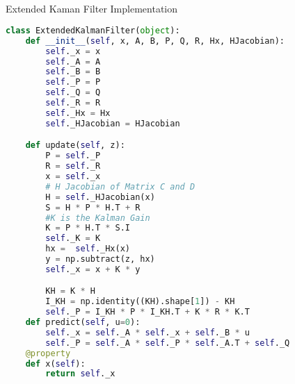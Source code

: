 \subsection{}{Extended Kaman Filter Implementation}

\begin{lstlisting}[language=Python, caption=Extended Kalaman Filter Script]  
class ExtendedKalmanFilter(object):
    def __init__(self, x, A, B, P, Q, R, Hx, HJacobian):
        self._x = x
        self._A = A
        self._B = B
        self._P = P
        self._Q = Q
        self._R = R
        self._Hx = Hx
        self._HJacobian = HJacobian

    def update(self, z):
        P = self._P
        R = self._R
        x = self._x
        # H Jacobian of Matrix C and D
        H = self._HJacobian(x)
        S = H * P * H.T + R
        #K is the Kalman Gain 
        K = P * H.T * S.I
        self._K = K
        hx =  self._Hx(x)
        y = np.subtract(z, hx)
        self._x = x + K * y

        KH = K * H
        I_KH = np.identity((KH).shape[1]) - KH
        self._P = I_KH * P * I_KH.T + K * R * K.T
    def predict(self, u=0):
        self._x = self._A * self._x + self._B * u
        self._P = self._A * self._P * self._A.T + self._Q
    @property
    def x(self):
        return self._x
\end{lstlisting}